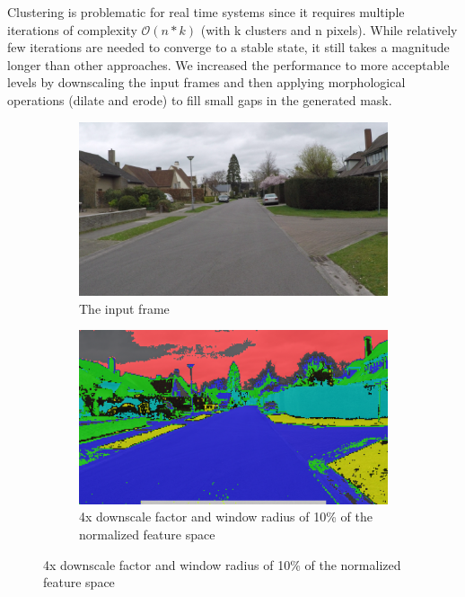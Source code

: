 \documentclass[oneside,english]{llncs}
\begin{document}
Clustering is problematic for real time systems since it requires multiple iterations of complexity $\mathcal{O}(n * k)$ (with k clusters and n pixels). While relatively few iterations are needed to converge to a stable state, it still takes a magnitude longer than other approaches. We increased the performance to more acceptable levels by downscaling the input frames and then applying morphological operations (dilate and erode) to fill small gaps in the generated mask.

\begin{figure}
    \centering
    \begin{subfigure}[t]{0.3\textwidth}
        \centering
        \includegraphics[width=1\textwidth]{clustering_input}
        \caption{The input frame}
        \label{fig:Clustering-input}
    \end{subfigure}
    \hfill
    \begin{subfigure}[t]{0.3\textwidth}
        \centering
        \includegraphics[width=1\textwidth]{clustering_scale4_radius_01}
        \caption{4x downscale factor and window radius of 10\% of the normalized feature space}
        \label{fig:Clustering-window10}

\end{subfigure}
\end{figure}
\end{document}
